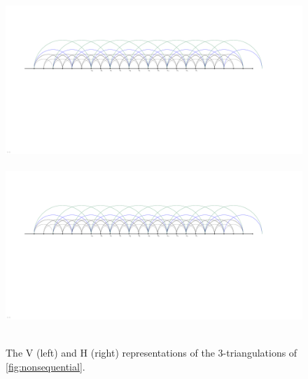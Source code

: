 \documentclass{amsart}
\theoremstyle{remark}
\begin{document}
\begin{figure}[b]
	\capstart
	\mbox{\includegraphics[page=6, scale=.5, clip, trim=21.2cm 0cm 24cm 6cm]{FNSk3p2} \quad {}} \\[.5cm]
	\mbox{\includegraphics[page=7, scale=.5, clip, trim=21.2cm 0cm 24cm 6cm]{FNSk3p2} \quad {}}
	\caption{The V (left) and H (right) representations of the $3$-triangulations of \cref{fig:nonsequential}.}
	\label{fig:nonsequentialVHrep}
\end{figure}
\end{document}
